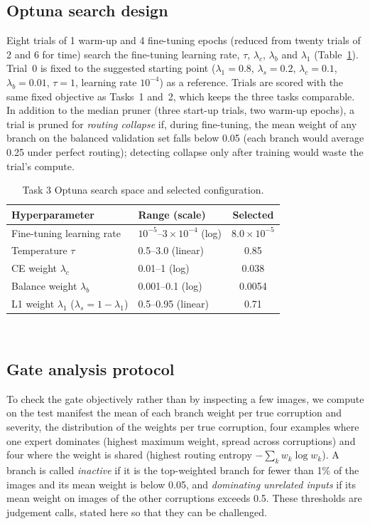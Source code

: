 \documentclass[conference]{IEEEtran}
\begin{document}
\subsection{Optuna search design}
Eight trials of 1 warm-up and 4 fine-tuning epochs (reduced from twenty
trials of 2 and 6 for time) search the fine-tuning
learning rate, $\tau$, $\lambda_c$, $\lambda_b$ and $\lambda_1$
(Table~\ref{tab:task3_space}). Trial~0 is fixed to the suggested starting
point ($\lambda_1=0.8$, $\lambda_s=0.2$, $\lambda_c=0.1$, $\lambda_b=0.01$,
$\tau=1$, learning rate $10^{-4}$) as a reference. Trials are scored with
the same fixed objective as Tasks~1 and~2, which keeps the three tasks
comparable. In addition to the median pruner (three start-up trials, two
warm-up epochs), a trial is pruned for \emph{routing collapse} if, during
fine-tuning, the mean weight of any branch on the balanced validation set
falls below 0.05 (each branch would average 0.25 under perfect routing);
detecting collapse only after training would waste the trial's compute.

\begin{table}[t]
\centering
\caption{Task 3 Optuna search space and selected configuration.}
\label{tab:task3_space}
\footnotesize
\begin{tabular}{llc}
\toprule
Hyperparameter & Range (scale) & Selected \\
\midrule
Fine-tuning learning rate & $10^{-5}$--$3\times10^{-4}$ (log) & $8.0\times10^{-5}$ \\
Temperature $\tau$ & 0.5--3.0 (linear) & 0.85 \\
CE weight $\lambda_c$ & 0.01--1 (log) & 0.038 \\
Balance weight $\lambda_b$ & 0.001--0.1 (log) & 0.0054 \\
L1 weight $\lambda_1$ ($\lambda_s=1-\lambda_1$) & 0.5--0.95 (linear) & 0.71 \\
\bottomrule
\end{tabular}
\\[3pt]
\end{table}

\subsection{Gate analysis protocol}
To check the gate objectively rather than by inspecting a few images, we
compute on the test manifest the mean of each branch weight per true
corruption and severity, the distribution of the weights per true
corruption, four examples where one expert dominates (highest maximum
weight, spread across corruptions) and four where the weight is shared
(highest routing entropy $-\sum_k w_k\log w_k$). A branch is called
\emph{inactive} if it is the top-weighted branch for fewer than 1\% of the
images and its mean weight is below 0.05, and \emph{dominating unrelated
inputs} if its mean weight on images of the other corruptions exceeds 0.5.
These thresholds are judgement calls, stated here so that they can be
challenged.
\end{document}
